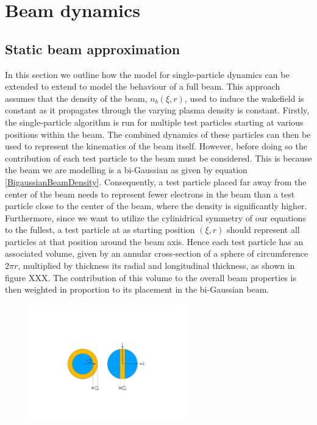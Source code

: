 \section{Beam dynamics}
\subsection{Static beam approximation}
In this section we outline how the model for single-particle dynamics can be extended to extend to model the behaviour of a full beam. This approach assumes that the density of the beam, $n_b(\xi,r)$, used to induce the wakefield is constant as it propagates through the varying plasma density is constant.  Firstly, the single-particle algorithm is run for multiple test particles starting at various positions within the beam. The combined dynamics of these particles can then be used to represent the kinematics of the beam itself. However, before doing so the contribution of each test particle to the beam must be considered. This is because the beam we are modelling is a bi-Gaussian as given by equation \ref{BigaussianBeamDensity}. Consequently, a test particle placed far away from the center of the beam needs to represent fewer electrons in the beam than a test particle close to the center of the beam, where the density is significantly higher. Furthermore, since we want to utilize the cylinidrical symmetry of our equations to the fullest, a test particle at as starting position $(\xi,r)$ should represent all particles at that position around the beam axis. Hence each test particle has an associated volume, given by an annular cross-section of a sphere of circumference $2\pi r$, multiplied by thickness its radial and longitudinal thickness, as shown in figure XXX. The contribution of this volume to the overall beam properties is then weighted in proportion to its placement in the bi-Gaussian beam. 
\begin{figure}
\centering
\includegraphics[width=0.6\textwidth]{AnnularCrosssSection}
\end{figure}
